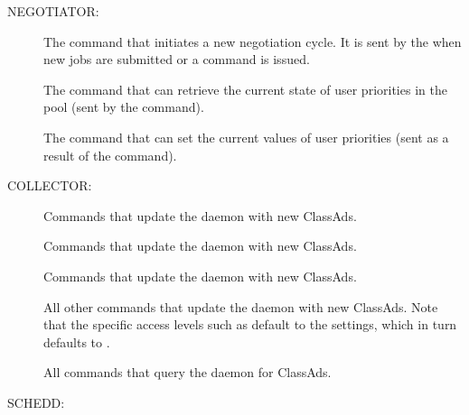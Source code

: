 NEGOTIATOR:

\begin{description}
\item[]
The command that initiates a new negotiation
  cycle. It is sent by the  when new jobs are submitted
  or a  command is issued.

\item[]
The command that can retrieve the current state
  of user priorities in the pool (sent by the  command).

\item[]
The command that can set the current
  values of user priorities (sent as a result of the 
  command).
\end{description}

COLLECTOR:

\begin{description}

\item[]
Commands that update the  daemon with new  ClassAds.

\item[]
Commands that update the  daemon with new  ClassAds.

\item[]
Commands that update the  daemon with new  ClassAds.

\item[]
All other commands that update the  daemon with new
ClassAds.  Note that the specific access levels such as
 default to the  settings,
which in turn defaults to .

\item[]
All commands that query the  daemon for ClassAds.
\end{description}

SCHEDD: 

